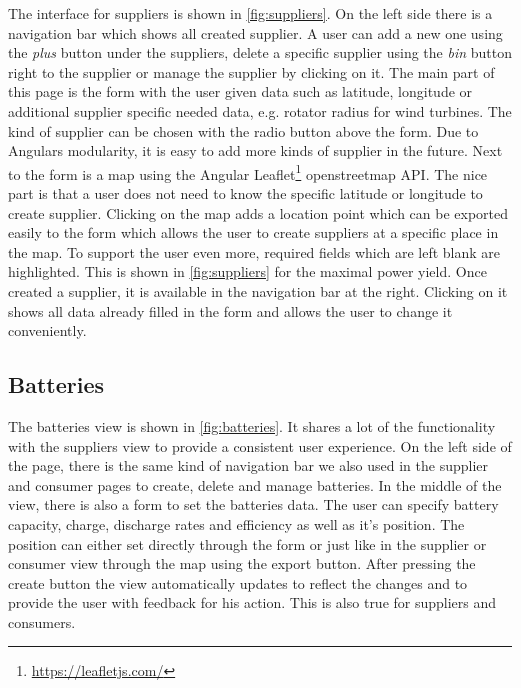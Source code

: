 The interface for suppliers is shown in \cref{fig:suppliers}.
On the left side there is a navigation bar which shows all created supplier.
A user can add a new one using the \textit{plus} button under the suppliers, delete a specific supplier using the \textit{bin} button right to the supplier or manage the supplier by clicking on it.
The main part of this page is the form with the user given data such as latitude, longitude or additional supplier specific needed data, e.g. rotator radius for wind turbines.
The kind of supplier can be chosen with the radio button above the form.
Due to Angulars modularity, it is easy to add more kinds of supplier in the future.
Next to the form is a map using the Angular Leaflet\footnote{\url{https://leafletjs.com/}} openstreetmap API.
The nice part is that a user does not need to know the specific latitude or longitude to create supplier.
Clicking on the map adds a location point which can be exported easily to the form which allows the user to create suppliers at a specific place in the map. To support the user even more, required fields which are left blank are highlighted. This is shown in \cref{fig:suppliers} for the maximal power yield.
Once created a supplier, it is available in the navigation bar at the right.
Clicking on it shows all data already filled in the form and allows the user to change it conveniently. 


\subsection{Batteries}
The batteries view is shown in \cref{fig:batteries}.
It shares a lot of the functionality with the suppliers view to provide a consistent user experience. On the left side of the page, there is the same kind of navigation bar we also used in the supplier and consumer pages to create, delete and manage batteries.
In the middle of the view, there is also a form to set the batteries data.
The user can specify battery capacity, charge, discharge rates and efficiency as well as it's position.
The position can either set directly through the form or just like in the supplier or consumer view through the map using the export button. After pressing the create button the view automatically updates to reflect the changes and to provide the user with feedback for his action. This is also true for suppliers and consumers.

